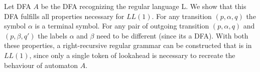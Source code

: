 Let DFA $A$ be the DFA recognizing the regular language L.
We show that this DFA fulfills all properties necessary for $LL(1)$.
For any transition $(p, \alpha, q)$ the symbol $\alpha$ is a terminal symbol.
For any pair of outgoing transition $(p, \alpha, q)$ and $(p, \beta, q')$ the labels $\alpha$ and $\beta$ need to be different (since its a DFA).
With both these properties, a right-recursive regular grammar can be constructed that is in $LL(1)$, since only a single token of lookahead is necessary to recreate the behaviour of automaton $A$.